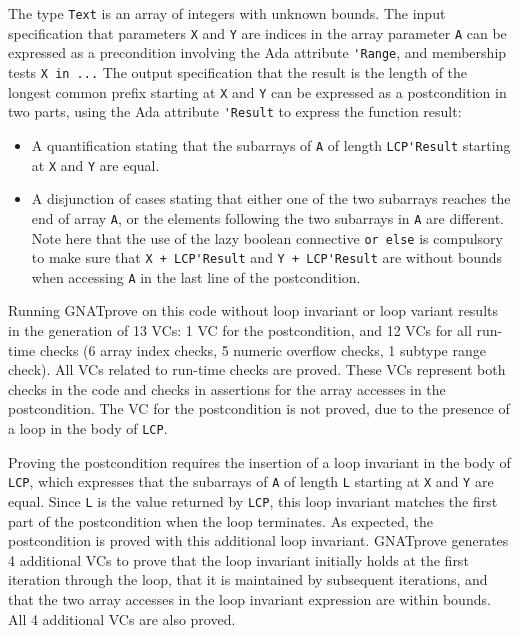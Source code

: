 \documentclass[sttt,draft]{svjour}
\newcommand{\gnatprove}{GNATprove\xspace}
\begin{document}
The type \verb|Text| is an array of integers with unknown bounds. The input
specification that parameters \verb|X| and \verb|Y| are indices in the array
parameter \verb|A| can be expressed as a precondition involving the Ada
attribute \verb|'Range|, and membership tests \verb|X in ...| The output
specification that the result is the length of the longest common prefix
starting at \verb|X| and \verb|Y| can be expressed as a postcondition in two
parts, using the Ada attribute \verb|'Result| to express the function result:
\begin{itemize}
\item A quantification stating that the subarrays of \verb|A| of length
  \verb|LCP'Result| starting at \verb|X| and \verb|Y| are equal.
\item A disjunction of cases stating that either one of the two subarrays
  reaches the end of array \verb|A|, or the elements following the two
  subarrays in \verb|A| are different. Note here that the use of the lazy
  boolean connective \verb|or else| is compulsory to make sure that
  \verb|X + LCP'Result| and \verb|Y + LCP'Result| are without bounds when
  accessing \verb|A| in the last line of the postcondition.
\end{itemize}

Running \gnatprove on this code without loop invariant or loop variant results
in the generation of 13 VCs: 1 VC for the postcondition, and 12 VCs for all
run-time checks (6 array index checks, 5 numeric overflow checks, 1 subtype
range check). All VCs related to run-time checks are proved. These VCs
represent both checks in the code and checks in assertions for the array
accesses in the postcondition. The VC for the postcondition is not proved, due
to the presence of a loop in the body of \verb|LCP|.

Proving the postcondition requires the insertion of a loop invariant in the
body of \verb|LCP|, which expresses that the subarrays of \verb|A| of length
\verb|L| starting at \verb|X| and \verb|Y| are equal. Since \verb|L| is the
value returned by \verb|LCP|, this loop invariant matches the first part of the
postcondition when the loop terminates. As expected, the postcondition is
proved with this additional loop invariant. \gnatprove generates 4 additional
VCs to prove that the loop invariant initially holds at the first iteration
through the loop, that it is maintained by subsequent iterations, and that the
two array accesses in the loop invariant expression are within bounds. All 4
additional VCs are also proved.
\end{document}
